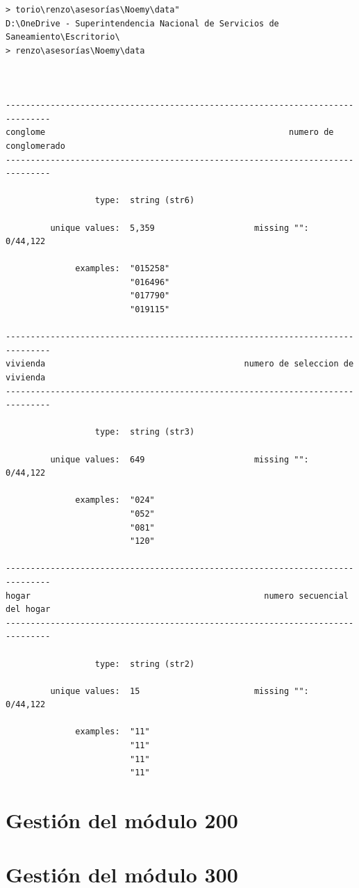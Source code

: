 \documentclass[
]{book}
\theoremstyle{definition}
\theoremstyle{definition}
\theoremstyle{definition}
\theoremstyle{definition}
\theoremstyle{remark}
\begin{document}
\begin{verbatim}
> torio\renzo\asesorías\Noemy\data"
D:\OneDrive - Superintendencia Nacional de Servicios de Saneamiento\Escritorio\
> renzo\asesorías\Noemy\data



-------------------------------------------------------------------------------
conglome                                                 numero de conglomerado
-------------------------------------------------------------------------------

                  type:  string (str6)

         unique values:  5,359                    missing "":  0/44,122

              examples:  "015258"
                         "016496"
                         "017790"
                         "019115"

-------------------------------------------------------------------------------
vivienda                                        numero de seleccion de vivienda
-------------------------------------------------------------------------------

                  type:  string (str3)

         unique values:  649                      missing "":  0/44,122

              examples:  "024"
                         "052"
                         "081"
                         "120"

-------------------------------------------------------------------------------
hogar                                               numero secuencial del hogar
-------------------------------------------------------------------------------

                  type:  string (str2)

         unique values:  15                       missing "":  0/44,122

              examples:  "11"
                         "11"
                         "11"
                         "11"
\end{verbatim}

\hypertarget{gestiuxf3n-del-muxf3dulo-200}{%
\section{Gestión del módulo 200}\label{gestiuxf3n-del-muxf3dulo-200}}

\hypertarget{gestiuxf3n-del-muxf3dulo-300}{%
\section{Gestión del módulo 300}\label{gestiuxf3n-del-muxf3dulo-300}}
\end{document}
